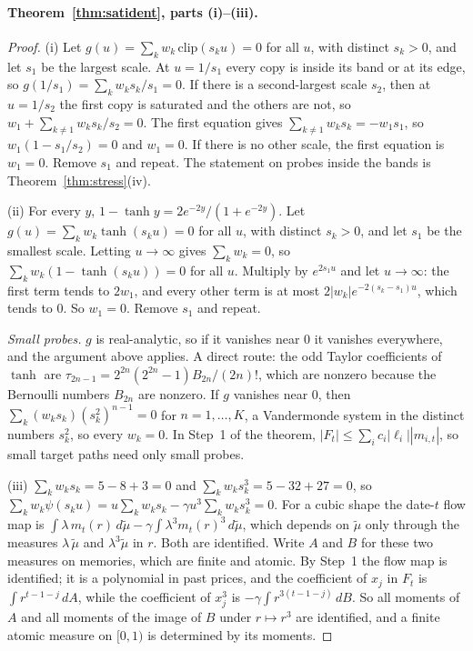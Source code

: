 \documentclass[12pt]{article}
\theoremstyle{definition}
\theoremstyle{remark}
\begin{document}
\paragraph{Theorem~\ref{thm:satident}, parts (i)--(iii).}
\begin{proof}
(i) Let $g(u)=\sum_kw_k\,\mathrm{clip}(s_ku)=0$ for all $u$, with distinct $s_k>0$, and let $s_1$ be the largest scale. At $u=1/s_1$ every copy is inside its band or at its edge, so $g(1/s_1)=\sum_kw_ks_k/s_1=0$. If there is a second-largest scale $s_2$, then at $u=1/s_2$ the first copy is saturated and the others are not, so $w_1+\sum_{k\ne1}w_ks_k/s_2=0$. The first equation gives $\sum_{k\ne1}w_ks_k=-w_1s_1$, so $w_1(1-s_1/s_2)=0$ and $w_1=0$. If there is no other scale, the first equation is $w_1=0$. Remove $s_1$ and repeat. The statement on probes inside the bands is Theorem~\ref{thm:stress}(iv).

(ii) For every $y$, $1-\tanh y=2e^{-2y}/(1+e^{-2y})$. Let $g(u)=\sum_kw_k\tanh(s_ku)=0$ for all $u$, with distinct $s_k>0$, and let $s_1$ be the smallest scale. Letting $u\to\infty$ gives $\sum_kw_k=0$, so $\sum_kw_k(1-\tanh(s_ku))=0$ for all $u$. Multiply by $e^{2s_1u}$ and let $u\to\infty$: the first term tends to $2w_1$, and every other term is at most $2|w_k|e^{-2(s_k-s_1)u}$, which tends to $0$. So $w_1=0$. Remove $s_1$ and repeat.

\emph{Small probes.} $g$ is real-analytic, so if it vanishes near $0$ it vanishes everywhere, and the argument above applies. A direct route: the odd Taylor coefficients of $\tanh$ are $\tau_{2n-1}=2^{2n}(2^{2n}-1)B_{2n}/(2n)!$, which are nonzero because the Bernoulli numbers $B_{2n}$ are nonzero. If $g$ vanishes near $0$, then $\sum_k(w_ks_k)(s_k^2)^{n-1}=0$ for $n=1,\ldots,K$, a Vandermonde system in the distinct numbers $s_k^2$, so every $w_k=0$. In Step~1 of the theorem, $|F_t|\le\sum_ic_i|\ell_i||m_{i,t}|$, so small target paths need only small probes.

(iii) $\sum_kw_ks_k=5-8+3=0$ and $\sum_kw_ks_k^3=5-32+27=0$, so $\sum_kw_k\psi(s_ku)=u\sum_kw_ks_k-\gamma u^3\sum_kw_ks_k^3=0$. For a cubic shape the date-$t$ flow map is $\int\lambda\,m_t(r)\,d\tilde\mu-\gamma\int\lambda^3m_t(r)^3\,d\tilde\mu$, which depends on $\tilde\mu$ only through the measures $\lambda\,\tilde\mu$ and $\lambda^3\tilde\mu$ in $r$. Both are identified. Write $A$ and $B$ for these two measures on memories, which are finite and atomic. By Step~1 the flow map is identified; it is a polynomial in past prices, and the coefficient of $x_j$ in $F_t$ is $\int r^{t-1-j}\,dA$, while the coefficient of $x_j^3$ is $-\gamma\int r^{3(t-1-j)}\,dB$. So all moments of $A$ and all moments of the image of $B$ under $r\mapsto r^3$ are identified, and a finite atomic measure on $[0,1)$ is determined by its moments.
\end{proof}
\end{document}
